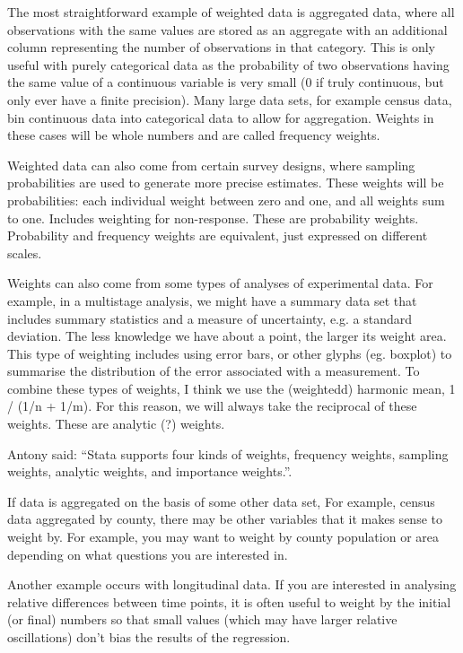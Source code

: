 \documentclass[oneside,letterpaper]{scrartcl}
\begin{document}
The most straightforward example of weighted data is aggregated data, where all observations with the same values are stored as an aggregate with an additional column representing the number of observations in that category.  This is only useful with purely categorical data as the probability of two observations having the same value of a continuous variable is very small (0 if truly continuous, but only ever have a finite precision).  Many large data sets, for example census data, bin continuous data into categorical data to allow for aggregation.  Weights in these cases will be whole numbers and are called frequency weights.

Weighted data can also come from certain survey designs, where sampling probabilities are used to generate more precise estimates.  These weights will be probabilities: each individual weight between zero and one, and all weights sum to one.  Includes weighting for non-response.  These are probability weights.  Probability and frequency weights are equivalent, just expressed on different scales. 

Weights can also come from some types of analyses of experimental data. For example, in a multistage analysis, we might have a summary data set that includes summary statistics and a measure of uncertainty, e.g. a standard deviation. The less knowledge we have about a point, the larger its weight area. This type of weighting includes using error bars, or other glyphs (eg. boxplot) to summarise the distribution of the error associated with a measurement. To combine these types of weights, I think we use the (weightedd) harmonic mean, 1 / (1/n + 1/m).  For this reason, we will always take the reciprocal of these weights. These are analytic (?) weights.

Antony said: ``Stata supports four kinds of weights, frequency weights, sampling weights, analytic weights, and importance weights.''.

If data is aggregated on the basis of some other data set,  For example, census data aggregated by county, there may be other variables that it makes sense to weight by.  For example, you may want to weight by county population or area depending on what questions you are interested in.

Another example occurs with longitudinal data.  If you are interested in analysing relative differences between time points, it is often useful to weight by the initial (or final) numbers so that small values (which may have larger relative oscillations) don't bias the results of the regression.
\end{document}
